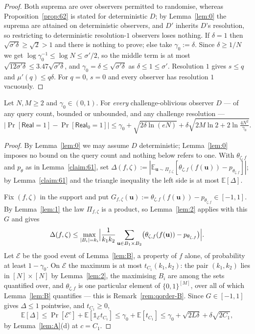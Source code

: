 \documentclass{aicr-solution}
\newcommand{\Real}{\mathsf{Real}}
\newcommand{\Prob}[1]{\Pr\!\left[#1\right]}
\newcommand{\Exp}{\mathbb{E}}
\newcommand{\bits}{\{0,1\}}
\newcommand{\vu}{\mathbf{u}}
\newcommand{\ind}{\mathbb{1}}
\begin{document}
\begin{proof}
Both suprema are over observers permitted to randomise, whereas
Proposition~\ref{prop:62} is stated for deterministic $D$; by Lemma~\ref{lem:0} the
suprema are attained on deterministic observers, and $D'$ inherits $D$'s
resolution, so restricting to deterministic resolution-$1$ observers loses nothing.
If $\delta = 1$ then $\sqrt{\sigma'\delta} \ge \sqrt2 > 1$ and there is nothing to
prove; else take $\gamma_0 := \delta$. Since $\delta \ge 1/N$ we get
$\log\gamma_0^{-1} \le \log N \le \sigma'/2$, so the middle term is at most
$\sqrt{12\sigma'\delta} \le 3.47\sqrt{\sigma'\delta}$, and
$\gamma_0 = \delta \le \sqrt{\sigma'\delta}$ as $\delta \le 1 \le \sigma'$.
Resolution $1$ gives $s \le q$ and $\mu'(q) \le q\delta$. For $q = 0$, $s = 0$ and
every observer has resolution $1$ vacuously.
\end{proof}

\begin{theorem}\label{thm:D}
Let $N,M \ge 2$ and $\gamma_0 \in (0,1)$. For \emph{every} challenge-oblivious
observer $D$ --- of any query count, bounded or unbounded, and any challenge
resolution ---
\[
  \bigl|\Prob{\Real = 1} - \Prob{\Real_0 = 1}\bigr| \le
  \gamma_0 + \sqrt{2\delta \ln(eN)}
  + \delta\sqrt{2M\ln 2 + 2\ln \tfrac{4N^{2}}{\gamma_0}} .
\]
\end{theorem}

\begin{proof}
By Lemma~\ref{lem:0} we may assume $D$ deterministic; Lemma~\ref{lem:0} imposes no
bound on the query count and nothing below refers to one. With $\theta_{\zeta,f}$
and $p_\theta$ as in Lemma~\ref{claim:61}, set
$\Delta(f,\zeta) := |\Exp_{\vu \sim \Pi_{f,\zeta}}
[\theta_{\zeta,f}(f(\vu)) - p_{\theta_{\zeta,f}}]|$; by Lemma~\ref{claim:61} and the
triangle inequality the left side is at most $\Exp[\Delta]$.

Fix $(f,\zeta)$ in the support and put
$G_{f,\zeta}(\vu) := \theta_{\zeta,f}(f(\vu)) - p_{\theta_{\zeta,f}} \in [-1,1]$. By
Lemma~\ref{lem:1} the law $\Pi_{f,\zeta}$ is a product, so Lemma~\ref{lem:2}
applies with this $G$ and gives
\[
  \Delta(f,\zeta) \le \max_{|B_i| = k_i}
  \Bigl|\frac{1}{k_1k_2}\sum_{\vu \in B_1 \times B_2}
  \bigl(\theta_{\zeta,f}(f(\vu)) - p_{\theta_{\zeta,f}}\bigr)\Bigr| .
\]
Let $\mathcal{E}$ be the good event of Lemma~\ref{lem:B}, a property of $f$ alone,
of probability at least $1 - \gamma_0$. On $\mathcal{E}$ the maximum is at most
$t_{C_1}(k_1,k_2)$: the pair $(k_1,k_2)$ lies in $[N] \times [N]$ by
Lemma~\ref{lem:2}, the maximising $B_i$ are among the sets quantified over, and
$\theta_{\zeta,f}$ is one particular element of $\bits^{[M]}$, over all of which
Lemma~\ref{lem:B} quantifies --- this is Remark~\ref{rem:qorder-B}. Since
$G \in [-1,1]$ gives $\Delta \le 1$ pointwise, and $t_{C_1} \ge 0$,
\[
  \Exp[\Delta] \le \Prob{\mathcal{E}^{c}} + \Exp[\ind_{\mathcal{E}} t_{C_1}]
  \le \gamma_0 + \Exp[t_{C_1}] \le \gamma_0 + \sqrt{2L\delta} + \delta\sqrt{2C_1},
\]
by Lemma~\ref{lem:A}(d) at $c = C_1$.
\end{proof}
\end{document}
